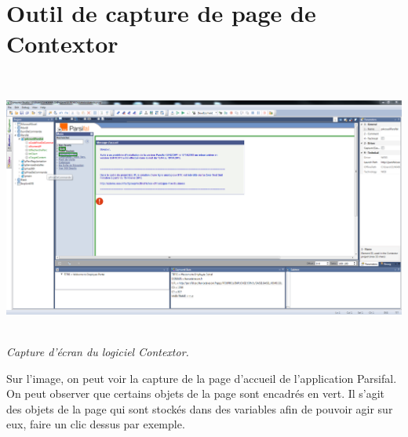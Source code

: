 \documentclass[a4paper,twoside,12pt]{report}
\begin{document}
\chapter{Outil de capture de page de Contextor}
\begin{center}
\includegraphics[height=9cm]{contextorCapture.PNG}\\
\itshape Capture d'écran du logiciel Contextor.
\end{center}
Sur l'image, on peut voir la capture de la page d'accueil de l'application Parsifal. On peut observer que certains objets de la page sont encadrés en vert. Il s'agit des objets de la page qui sont stockés dans des variables afin de pouvoir agir sur eux, faire un clic dessus par exemple.
\end{document}
